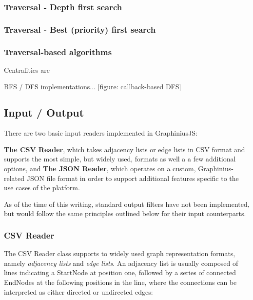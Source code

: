 		\subsubsection{Traversal - Depth first search}
		\label{sssect:search_dfs}
		
		\subsubsection{Traversal - Best (priority) first search}
		\label{sssect:search_pfs}
		
		\subsubsection{Traversal-based algorithms}
		\label{sssect:travseral_algos}
		
		Centralities are 
		
		BFS / DFS implementations... [figure: callback-based DFS]

	
	\subsection{Input / Output}
	\label{ssect:input_output}
	
	There are two basic input readers implemented in GraphiniusJS: 
	
	\textbf{The CSV Reader}, which takes adjacency lists or edge lists in CSV format and supports the most simple, but widely used, formats as well a a few additional options, and
	\textbf{The JSON Reader}, which operates on a custom, Graphinius-related JSON file format in order to support additional features specific to the use cases of the platform.
	
	As of the time of this writing, standard output filters have not been implemented, but would follow the same principles outlined below for their input counterparts.
		
		
		\subsubsection{CSV Reader}
		\label{sssection: io_csv}
		
		The CSV Reader class supports to widely used graph representation formats, namely \textit{adjacency lists} and \textit{edge lists}. An adjacency list is usually composed of lines indicating a StartNode at position one, followed by a series of connected EndNodes at the following positions in the line, where the connections can be interpreted as either directed or undirected edges:
		
